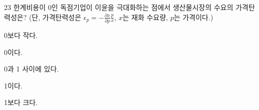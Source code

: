 \begin{question}{23}
한계비용이 0인 독점기업이 이윤을 극대화하는 점에서 생산물시장의 수요의 가격탄력성은? (단, 가격탄력성은 $\epsilon_{ p } = - \frac{ \partial x } { \partial p } \frac{p} x$, $x$는 재화 수요량, $p$는 가격이다.)
\begin{choices}
  \item 0보다 작다.
  \item 0이다.
  \item 0과 1 사이에 있다.
  \item 1이다.
  \item 1보다 크다.
\end{choices}
\end{question}
